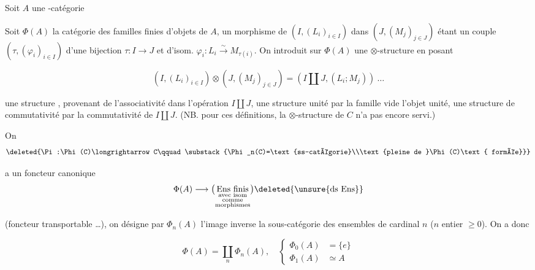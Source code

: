 
Soit $A$ une \deleted{$\unsure{\otimes}$}-catégorie \\

 Soit $\Phi(A)$ la catégorie des familles finies d'objets de $A$, un morphisme de $(I,(L_i)_{i\in I})$ dans $(J,(M_j)_{j\in J})$ étant un couple $(\tau,(\varphi_i)_{i\in I})$ d'une bijection $\tau:I\to J$ et d'isom. $\varphi_i:L_i\xrightarrow{\sim}M_{\tau(i)}$. On introduit sur $\Phi(A)$ une $\otimes$-structure en posant

\[(I,(L_i)_{i\in I})\otimes(J,(M_j)_{j\in J})=(I\amalg J,(L_i;M_j))\ \ldots\]

 une structure , provenant de l'associativité dans l'opération $I\amalg J$, une structure unité par la famille vide  l'objet unité, une structure de commutativité par la commutativité de $I\amalg J$. (NB. pour ces définitions, la $\otimes$-structure de $C$ n'a pas encore servi.)

On  
\[
\deleted{\Pi:\Phi(C)\longrightarrow C\qquad
\substack{\Phi_n(C)=\text{ss-catégorie}\\\text{pleine de }\Phi(C)\text{ formée}}}
\]

a un foncteur canonique
\[\Phi(A)\longrightarrow\big(\underset{\substack{\text{avec isom}\\\text{comme}\\\text{morphismes}}}{\mathrm{Ens\ finis}}\big)\deleted{\unsure{\text{ds Ens}}}\]

(foncteur transportable \ldots), on désigne par $\Phi_n(A)$ l'image inverse  la sous-catégorie des ensembles de  cardinal $n$ ($n$ entier $\geq 0$). On a donc

\[\Phi(A)=\coprod_n\Phi_n(A),\quad\left\{\begin{aligned}
\Phi_0(A)&=\{e\}\\
\Phi_1(A)&\simeq A
\end{aligned}\right.\]

